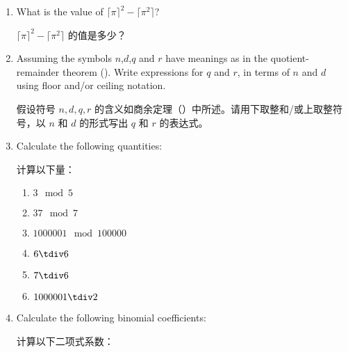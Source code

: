 \begin{enumerate}
  \workbookpagebreak
  
  \item What is the value of $\lceil\pi\rceil^{2}-\lceil\pi^{2}\rceil$?
  
  $\lceil\pi\rceil^{2}-\lceil\pi^{2}\rceil$ 的值是多少？
  \wbvfill
  
  
  
  
  \item Assuming the symbols $n$,$d$,$q$ and $r$ have meanings as in the
    quotient-remainder theorem ().
  Write
    expressions for $q$ and $r$, in terms of $n$ and $d$ using floor
    and/or ceiling notation.
    
    假设符号 $n,d,q,r$ 的含义如商余定理（）中所述。请用下取整和/或上取整符号，以 $n$ 和 $d$ 的形式写出 $q$ 和 $r$ 的表达式。
  \wbvfill
  
  
  \hintspagebreak
  
  \item Calculate the following quantities:
  
  计算以下量：
  
  \begin{enumerate}
  \item \wbitemsep $3 \mod 5$
  \item \wbitemsep $37 \mod 7$
  \item \wbitemsep $1000001 \mod 100000$
  \item \wbitemsep $6 \tdiv 6$
  \item \wbitemsep $7 \tdiv 6$
  \item \wbitemsep $1000001 \tdiv 2$
  \end{enumerate}
  
  
  \workbookpagebreak
  
  \item Calculate the following binomial coefficients:
  
  计算以下二项式系数：
  

\end{enumerate}
